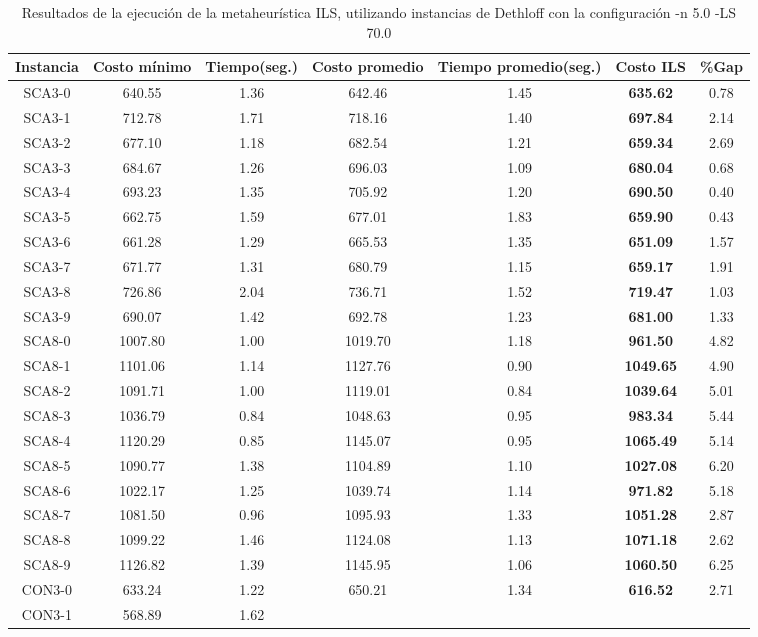 \begin{table}[ht]
\caption{Resultados de la ejecución de la metaheurística ILS, utilizando instancias de Dethloff con la configuración -n 5.0 -LS 70.0}
\centering
\small
\begin{tabular}{c c c c c c c}
\hline\hline
Instancia & Costo mínimo & Tiempo(seg.) & Costo promedio & Tiempo promedio(seg.) & Costo ILS & \%Gap \\ [0.5ex]
\hline
SCA3-0 & 640.55 & 1.36 & 
642.46 & 1.45 & \bf{635.62} & 
0.78\\SCA3-1 & 712.78 & 1.71 & 
718.16 & 1.40 & \bf{697.84} & 
2.14\\SCA3-2 & 677.10 & 1.18 & 
682.54 & 1.21 & \bf{659.34} & 
2.69\\SCA3-3 & 684.67 & 1.26 & 
696.03 & 1.09 & \bf{680.04} & 
0.68\\SCA3-4 & 693.23 & 1.35 & 
705.92 & 1.20 & \bf{690.50} & 
0.40\\SCA3-5 & 662.75 & 1.59 & 
677.01 & 1.83 & \bf{659.90} & 
0.43\\SCA3-6 & 661.28 & 1.29 & 
665.53 & 1.35 & \bf{651.09} & 
1.57\\SCA3-7 & 671.77 & 1.31 & 
680.79 & 1.15 & \bf{659.17} & 
1.91\\SCA3-8 & 726.86 & 2.04 & 
736.71 & 1.52 & \bf{719.47} & 
1.03\\SCA3-9 & 690.07 & 1.42 & 
692.78 & 1.23 & \bf{681.00} & 
1.33\\SCA8-0 & 1007.80 & 1.00 & 
1019.70 & 1.18 & \bf{961.50} & 
4.82\\SCA8-1 & 1101.06 & 1.14 & 
1127.76 & 0.90 & \bf{1049.65} & 
4.90\\SCA8-2 & 1091.71 & 1.00 & 
1119.01 & 0.84 & \bf{1039.64} & 
5.01\\SCA8-3 & 1036.79 & 0.84 & 
1048.63 & 0.95 & \bf{983.34} & 
5.44\\SCA8-4 & 1120.29 & 0.85 & 
1145.07 & 0.95 & \bf{1065.49} & 
5.14\\SCA8-5 & 1090.77 & 1.38 & 
1104.89 & 1.10 & \bf{1027.08} & 
6.20\\SCA8-6 & 1022.17 & 1.25 & 
1039.74 & 1.14 & \bf{971.82} & 
5.18\\SCA8-7 & 1081.50 & 0.96 & 
1095.93 & 1.33 & \bf{1051.28} & 
2.87\\SCA8-8 & 1099.22 & 1.46 & 
1124.08 & 1.13 & \bf{1071.18} & 
2.62\\SCA8-9 & 1126.82 & 1.39 & 
1145.95 & 1.06 & \bf{1060.50} & 
6.25\\CON3-0 & 633.24 & 1.22 & 
650.21 & 1.34 & \bf{616.52} & 
2.71\\CON3-1 & 568.89 & 1.62 & 

\end{tabular}
\end{table}
